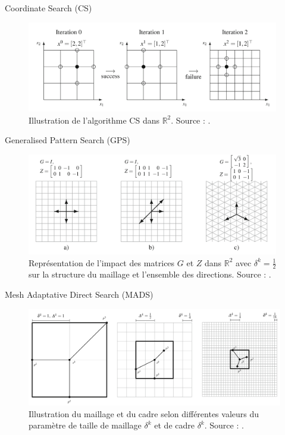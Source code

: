 \documentclass{beamer}
\begin{document}
\begin{frame}{Coordinate Search (CS)}
    \begin{figure}[htbp]
    \centering
    \includegraphics[width=11cm]{CS_algo_illustration.png}
    \caption{Illustration de l'algorithme CS dans $\mathbb{R}^2$. Source : \cite{AuHa2017a}.}
    \label{fig:CS}
\end{figure}
\end{frame}


\begin{frame}{Generalised Pattern Search (GPS)}
    \begin{figure}[htbp]
        \centering
        \includegraphics[width=11cm]{GPS_GZ.png}
        \caption{Représentation de l'impact des matrices $G$ et $Z$ dans $\mathbb{R}^2$ avec $\delta^k=\frac{1}{2}$ sur la structure du maillage et l'ensemble des directions. Source : \cite{AuHa2017a}.}
        \label{fig:GPS GZ}
    \end{figure}
\end{frame}

\begin{frame}{Mesh Adaptative Direct Search (MADS)}
    \begin{figure}
    \centering
    \includegraphics[width=11.2cm]{MADS_illustration_beamer.jpg}
    \caption{Illustration du maillage et du cadre selon différentes valeurs du paramètre de taille de maillage $\delta^k$ et de cadre $\delta^k$. Source : \cite{AuHa2017a}.}
    \label{fig:MADS illustration}
\end{figure}
\end{frame}
\end{document}
